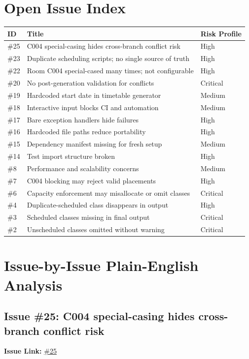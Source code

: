 \documentclass[12pt,a4paper]{article}
\begin{document}
\section{Open Issue Index}
\begin{longtable}{p{}p{}p{}}
\toprule
ID & Title & Risk Profile \\
\midrule
\endhead
\#25 & C004 special-casing hides cross-branch conflict risk & High \\
\#23 & Duplicate scheduling scripts; no single source of truth & High \\
\#22 & Room C004 special-cased many times; not configurable & High \\
\#20 & No post-generation validation for conflicts & Critical \\
\#19 & Hardcoded start date in timetable generator & Medium \\
\#18 & Interactive input blocks CI and automation & Medium \\
\#17 & Bare exception handlers hide failures & High \\
\#16 & Hardcoded file paths reduce portability & High \\
\#15 & Dependency manifest missing for fresh setup & Medium \\
\#14 & Test import structure broken & High \\
\#8 & Performance and scalability concerns & Medium \\
\#7 & C004 blocking may reject valid placements & High \\
\#6 & Capacity enforcement may misallocate or omit classes & Critical \\
\#4 & Duplicate-scheduled class disappears in output & High \\
\#3 & Scheduled classes missing in final output & Critical \\
\#2 & Unscheduled classes omitted without warning & Critical \\
\bottomrule
\end{longtable}

\section{Issue-by-Issue Plain-English Analysis}

\subsection*{Issue \#25: C004 special-casing hides cross-branch conflict risk}
\textbf{Issue Link:} \href{https://github.com/ArnavBallinCode/TimetableIIITDWD/issues/25}{\#25}
\end{document}
